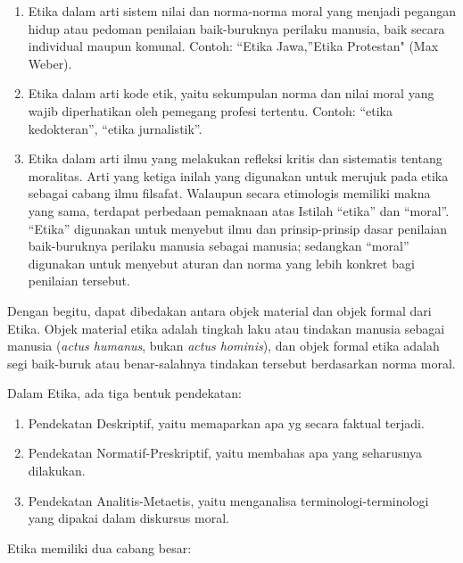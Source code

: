 \documentclass[10pt,a4paper]{article}
\def\tightlist{}
\begin{document}
\begin{multicols}{2}
\begin{itemize}
  \begin{enumerate}
  \def\labelenumi{\arabic{enumi}.}
  \tightlist
  \item
    Etika dalam arti sistem nilai dan norma-norma moral yang menjadi
    pegangan hidup atau pedoman penilaian baik-buruknya perilaku
    manusia, baik secara individual maupun komunal. Contoh: ``Etika
    Jawa,''Etika Protestan" (Max Weber).
  \item
    Etika dalam arti kode etik, yaitu sekumpulan norma dan nilai moral
    yang wajib diperhatikan oleh pemegang profesi tertentu. Contoh:
    ``etika kedokteran'', ``etika jurnalistik''.
  \item
    Etika dalam arti ilmu yang melakukan refleksi kritis dan sistematis
    tentang moralitas. Arti yang ketiga inilah yang digunakan untuk
    merujuk pada etika sebagai cabang ilmu filsafat. Walaupun secara
    etimologis memiliki makna yang sama, terdapat perbedaan pemaknaan
    atas Istilah ``etika'' dan ``moral''. ``Etika'' digunakan untuk
    menyebut ilmu dan prinsip-prinsip dasar penilaian baik-buruknya
    perilaku manusia sebagai manusia; sedangkan ``moral'' digunakan
    untuk menyebut aturan dan norma yang lebih konkret bagi penilaian
    tersebut.
  \end{enumerate}

  Dengan begitu, dapat dibedakan antara objek material dan objek formal
  dari Etika. Objek material etika adalah tingkah laku atau tindakan
  manusia sebagai manusia (\emph{actus humanus}, bukan \emph{actus
  hominis}), dan objek formal etika adalah segi baik-buruk atau
  benar-salahnya tindakan tersebut berdasarkan norma moral.

  Dalam Etika, ada tiga bentuk pendekatan:

  \begin{enumerate}
  \def\labelenumi{\arabic{enumi}.}
  \tightlist
  \item
    Pendekatan Deskriptif, yaitu memaparkan apa yg secara faktual
    terjadi.
  \item
    Pendekatan Normatif-Preskriptif, yaitu membahas apa yang seharusnya
    dilakukan.
  \item
    Pendekatan Analitis-Metaetis, yaitu menganalisa
    terminologi-terminologi yang dipakai dalam diskursus moral.
  \end{enumerate}

  Etika memiliki dua cabang besar:


\end{itemize}
\end{multicols}
\end{document}
